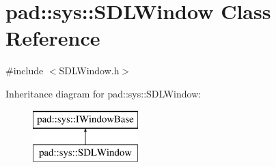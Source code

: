 \hypertarget{classpad_1_1sys_1_1_s_d_l_window}{}\section{pad\+:\+:sys\+:\+:S\+D\+L\+Window Class Reference}
\label{classpad_1_1sys_1_1_s_d_l_window}


{\ttfamily \#include $<$S\+D\+L\+Window.\+h$>$}

Inheritance diagram for pad\+:\+:sys\+:\+:S\+D\+L\+Window\+:\begin{figure}[H]
\begin{center}
\leavevmode
\includegraphics[height=2.000000cm]{classpad_1_1sys_1_1_s_d_l_window}
\end{center}
\end{figure}

